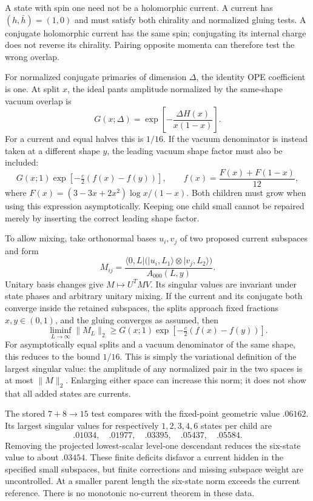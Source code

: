 A state with spin one need not be a holomorphic current. A current
has $(h,\bar h)=(1,0)$ and must satisfy both chirality and normalized
gluing tests. A conjugate holomorphic current has the same spin;
conjugating its internal charge does not reverse its chirality.
Pairing opposite momenta can therefore test the wrong overlap.

For normalized conjugate primaries of dimension $\Delta$, the
identity OPE coefficient is one. At split $x$, the ideal pants
amplitude normalized by the same-shape vacuum overlap is
\[
 G(x;\Delta)=
 \exp\!\left[-\frac{\Delta H(x)}{x(1-x)}\right].
\]
For a current and equal halves this is $1/16$. If the vacuum
denominator is instead taken at a different shape $y$, the leading
vacuum shape factor must also be included:
\[
 G(x;1)\exp[-\tfrac c2(f(x)-f(y))],
 \qquad f(x)=\frac{F(x)+F(1-x)}{12},
\]
where $F(x)=(3-3x+2x^2)\log x/(1-x)$.
Both children must grow when using this expression asymptotically.
Keeping one child small cannot be repaired merely by inserting the correct
leading shape factor.

To allow mixing, take orthonormal bases $u_i,v_j$ of two proposed
current subspaces and form
\[
 M_{ij}=\frac{\langle0,L|\bigl(|u_i,L_1\rangle\otimes|v_j,L_2\rangle\bigr)}
 {A_{000}(L,y)}.
\]
Unitary basis changes give $M\mapsto U^TMV$. Its singular values
are invariant under state phases and arbitrary unitary mixing.
If the current and its conjugate both converge inside the retained
subspaces, the splits approach fixed fractions $x,y\in(0,1)$,
and the gluing converges as assumed, then
\[
 \liminf_{L\to\infty}\|M_L\|_2
 \geq G(x;1)\exp[-\tfrac c2(f(x)-f(y))].
\]
For asymptotically equal splits and a vacuum denominator of
the same shape, this reduces to the bound $1/16$.
This is simply the variational definition of the largest singular
value: the amplitude of any normalized pair in the two spaces is
at most $\|M\|_2$. Enlarging either space can increase this norm;
it does not show that all added states are currents.

The stored $7+8\to15$ test compares with the fixed-point geometric
value $.06162$. Its largest singular values for respectively
$1,2,3,4,6$ states per child are
\[
 .01034,\quad .01977,\quad .03395,\quad .05437,\quad .05584.
\]
Removing the projected lowest-scalar level-one descendant reduces
the six-state value to about $.03454$. These finite deficits
disfavor a current hidden in the specified small subspaces, but
finite corrections and missing subspace weight are uncontrolled.
At a smaller parent length the six-state norm exceeds the current
reference. There is no monotonic no-current theorem in these data.


